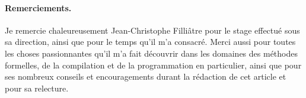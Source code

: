 \documentclass[a4paper]{easychair}
\begin{document}

\paragraph{Remerciements.} Je remercie chaleureusement Jean-Christophe
Filliâtre pour le stage effectué sous sa direction, ainsi que pour le
temps qu'il m'a consacré.
Merci aussi pour toutes les choses passionnantes qu'il m'a fait découvrir
dans les domaines des méthodes formelles, de la compilation et de la
programmation en particulier, ainsi que pour ses nombreux conseils et
encouragements durant la rédaction de cet article et pour sa relecture.




\end{document}
